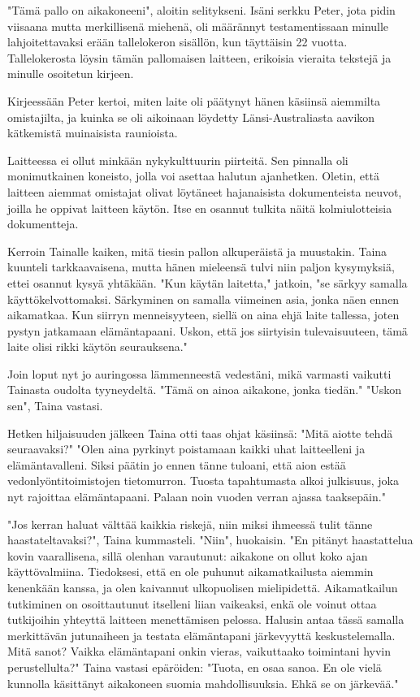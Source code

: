 ﻿\documentclass[a4paper, 12pt, finnish]{article}
\begin{document}
"Tämä pallo on aikakoneeni", aloitin selitykseni.
Isäni serkku Peter, jota pidin viisaana mutta merkillisenä
miehenä, oli määrännyt testamentissaan minulle
lahjoitettavaksi erään tallelokeron sisällön,
kun täyttäisin 22 vuotta. Tallelokerosta
löysin tämän pallomaisen laitteen, erikoisia vieraita tekstejä
ja minulle osoitetun kirjeen.

Kirjeessään Peter kertoi, miten laite oli päätynyt hänen käsiinsä
aiemmilta omistajilta, ja kuinka se oli aikoinaan löydetty
Länsi-Australiasta aavikon kätkemistä muinaisista raunioista.

Laitteessa ei ollut minkään nykykulttuurin piirteitä.
Sen pinnalla oli monimutkainen koneisto,
jolla voi asettaa halutun ajanhetken. Oletin,
että laitteen aiemmat omistajat olivat löytäneet hajanaisista
dokumenteista neuvot, joilla he oppivat laitteen käytön.
Itse en osannut tulkita näitä kolmiulotteisia dokumentteja.

Kerroin Tainalle kaiken, mitä tiesin pallon alkuperäistä ja muustakin.
Taina kuunteli tarkkaavaisena, mutta hänen mieleensä tulvi niin paljon
kysymyksiä, ettei osannut kysyä yhtäkään.
"Kun käytän laitetta," jatkoin, "se särkyy samalla käyttökelvottomaksi.
Särkyminen on samalla viimeinen asia, jonka näen ennen aikamatkaa.
Kun siirryn menneisyyteen, siellä on aina ehjä laite tallessa,
joten pystyn jatkamaan elämäntapaani. Uskon, että jos siirtyisin
tulevaisuuteen, tämä laite olisi rikki käytön seurauksena."

Join loput nyt jo auringossa lämmenneestä vedestäni,
mikä varmasti vaikutti Tainasta oudolta tyyneydeltä.
"Tämä on ainoa aikakone, jonka tiedän."
"Uskon sen", Taina vastasi.

Hetken hiljaisuuden jälkeen Taina otti taas ohjat käsiinsä:
"Mitä aiotte tehdä seuraavaksi?"
"Olen aina pyrkinyt poistamaan kaikki uhat laitteelleni
ja elämäntavalleni. Siksi päätin jo ennen tänne tuloani, että
aion estää vedonlyöntitoimistojen tietomurron. Tuosta
tapahtumasta alkoi julkisuus, joka nyt rajoittaa elämäntapaani.
Palaan noin vuoden verran ajassa taaksepäin."

"Jos kerran haluat välttää kaikkia riskejä, niin miksi
ihmeessä tulit tänne haastateltavaksi?", Taina kummasteli.
"Niin", huokaisin. "En pitänyt haastattelua kovin vaarallisena,
sillä olenhan varautunut: aikakone on ollut koko ajan käyttövalmiina.
Tiedoksesi, että en ole puhunut aikamatkailusta aiemmin 
kenenkään kanssa, ja olen kaivannut ulkopuolisen mielipidettä.
Aikamatkailun tutkiminen on osoittautunut itselleni
liian vaikeaksi, enkä ole voinut ottaa tutkijoihin
yhteyttä laitteen menettämisen pelossa.
Halusin antaa tässä samalla merkittävän jutunaiheen ja
testata elämäntapani järkevyyttä keskustelemalla.
Mitä sanot? Vaikka elämäntapani onkin vieras,
vaikuttaako toimintani hyvin perustellulta?"
Taina vastasi epäröiden: "Tuota, en osaa sanoa.
En ole vielä kunnolla käsittänyt aikakoneen suomia
mahdollisuuksia. Ehkä se on järkevää."
 
\end{document}
